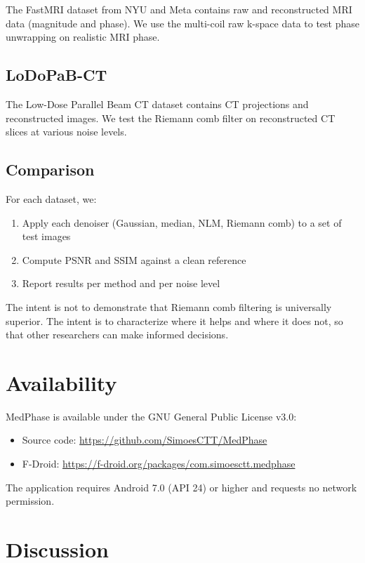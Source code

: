 \documentclass[11pt,a4paper]{article}
\begin{document}
The FastMRI dataset \cite{zbontar2020} from NYU and Meta contains raw and reconstructed MRI data (magnitude and phase). We use the multi-coil raw k-space data to test phase unwrapping on realistic MRI phase.

\subsection{LoDoPaB-CT}

The Low-Dose Parallel Beam CT dataset \cite{leuschner2020} contains CT projections and reconstructed images. We test the Riemann comb filter on reconstructed CT slices at various noise levels.

\subsection{Comparison}

For each dataset, we:
\begin{enumerate}
\item Apply each denoiser (Gaussian, median, NLM, Riemann comb) to a set of test images
\item Compute PSNR and SSIM against a clean reference
\item Report results per method and per noise level
\end{enumerate}

The intent is not to demonstrate that Riemann comb filtering is universally superior. The intent is to characterize where it helps and where it does not, so that other researchers can make informed decisions.

\section{Availability}

MedPhase is available under the GNU General Public License v3.0:

\begin{itemize}
\item Source code: \url{https://github.com/SimoesCTT/MedPhase}
\item F-Droid: \url{https://f-droid.org/packages/com.simoesctt.medphase}
\end{itemize}

The application requires Android 7.0 (API 24) or higher and requests no network permission.

\section{Discussion}
\end{document}
